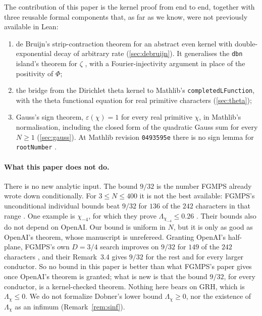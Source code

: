 \documentclass[11pt]{article}
\theoremstyle{definition}
\newcommand{\lean}[1]{\texttt{#1}}
\newcommand{\Lc}{\Lambda}
\begin{document}
\noindent
The contribution of this paper is the kernel proof from end to end, together with three reusable formal components that, as far as we know, were not previously available in Lean:
\begin{enumerate}[label=(\roman*)]
\item de Bruijn's strip-contraction theorem for an abstract even kernel with double-exponential decay of arbitrary rate (\cref{sec:debruijn}). It generalises the \lean{dbn} island's theorem for $\zeta$ \cite{Murphy932}, with a Fourier-injectivity argument in place of the positivity of $\Phi$;
\item the bridge from the Dirichlet theta kernel to Mathlib's \lean{completedLFunction}, with the theta functional equation for real primitive characters (\cref{sec:theta});
\item Gauss's sign theorem, $\varepsilon(\chi) = 1$ for every real primitive $\chi$, in Mathlib's normalisation, including the closed form of the quadratic Gauss sum for every $N \ge 1$ (\cref{sec:gauss}). At Mathlib revision \lean{0493595e} there is no sign lemma for \lean{rootNumber} \cite[NOTE\_D2]{bbrecords}.
\end{enumerate}

\paragraph{What this paper does not do.} There is no new analytic input. The bound $9/32$ is the number FGMPS already wrote down conditionally. For $3 \le N \le 400$ it is not the best available: FGMPS's unconditional individual bounds beat $9/32$ for $136$ of the $242$ characters in that range \cite[\S7.7, Table 8]{FGMPS2026}. One example is $\chi_{-4}$, for which they prove $\Lc_{\chi_{-4}} \le 0.26$ \cite[\S7.5]{FGMPS2026}. Their bounds also do not depend on OpenAI. Our bound is uniform in $N$, but it is only as good as OpenAI's theorem, whose manuscript is unrefereed. Granting OpenAI's half-plane, FGMPS's own $D = 3/4$ search improves on $9/32$ for $149$ of the $242$ characters \cite[Table~8]{FGMPS2026}, and their Remark~3.4 gives $9/32$ for the rest and for every larger conductor. So no bound in this paper is better than what FGMPS's paper gives once OpenAI's theorem is granted; what is new is that the bound $9/32$, for every conductor, is a kernel-checked theorem. Nothing here bears on GRH, which is $\Lc_\chi \le 0$. We do not formalize Dobner's lower bound $\Lc_\chi \ge 0$, nor the existence of $\Lc_\chi$ as an infimum (Remark~\ref{rem:sinf}).
\end{document}
